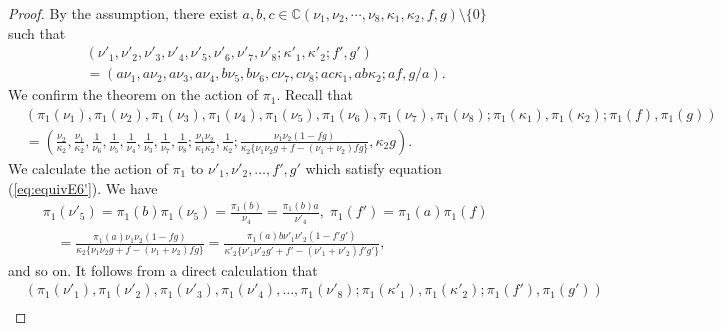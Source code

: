 \documentclass[12pt]{amsart}
\newcommand{\C}{\mathbb {C}}     %
\numberwithin{equation}{section}
\theoremstyle{definition}
\begin{document}
\begin{proof}
By the assumption, there exist $ a, b, c \in \C (\nu_1 , \nu_2 , \cdots ,\nu_8 ,\kappa_1 ,\kappa_2 , f ,g ) \setminus \{ 0 \} $ such that 
\begin{align}
&  (\nu '_1 , \nu '_2 , \nu '_3 , \nu '_4 ,\nu '_5 ,\nu '_6 , \nu '_7 ,\nu '_8 ; \kappa '_1 ,\kappa '_2 ; f' ,g' )  \label{eq:equivE6'} \\
& = (a \nu_1 , a \nu_2 , a \nu_3 , a \nu_4 ,b \nu_5 , b \nu_6 , c \nu_7 , c \nu_8 ; ac \kappa_1 , ab \kappa_2 ; af ,g/a). \nonumber
\end{align}
We confirm the theorem on the action of $\pi _1$.
Recall that
\begin{align}
& (\pi _1 ( \nu _1) , \pi _1 (\nu _2) , \pi _1 ( \nu _3) , \pi _1 ( \nu _4) , \pi _1 (\nu _5) , \pi _1 (\nu _6) , \pi _1 ( \nu _7) , \pi _1 (\nu _8) ;  \pi _1 (\kappa _1) , \pi _1 (\kappa _2) ;  \pi _1 (f ) , \pi _1 (g) ) \\
& = ( \frac{\nu  _2 }{\kappa _2}  , \frac{\nu  _1 }{\kappa _2}   , \frac{1}{ \nu _6} , \frac{1}{\nu  _5}  , \frac{1}{\nu  _4}  ,  \frac{1}{\nu  _3}  ,  \frac{1}{\nu _7} , \frac{1}{\nu _8} ; \frac{\nu _1 \nu _2 }{ \kappa_1\kappa _2}  , \frac{1}{ \kappa _2} ; \frac{\nu _1 \nu_2 ( 1- fg )}{ \kappa_2 \{ \nu _1 \nu_2 g + f- (\nu _1 + \nu _2 ) fg \} } , \kappa_2 g  ). \nonumber 
\end{align}
We calculate the action of $\pi _1$ to $\nu '_1 , \nu '_2 , \dots  , f' ,g' $ which satisfy equation (\ref{eq:equivE6'}).
We have
\begin{align}
&  \pi _1 ( \nu '_5 ) = \pi _1 ( b ) \pi _1 (\nu _5 )  =  \frac{\pi _1 ( b ) }{\nu _4} = \frac{\pi _1 ( b ) a }{ \nu '_4 } , \; \pi _1 ( f ') =  \pi _1 ( a ) \pi _1 (f )  \\
&  \quad = \frac{ \pi _1 ( a ) \nu _1 \nu_2 ( 1- fg )}{ \kappa_2 \{ \nu _1 \nu_2 g + f- (\nu _1 + \nu _2 ) fg \} }  = \frac{ \pi _1 ( a ) b \nu '_1 \nu '_2 ( 1- f'g' )}{ \kappa ' _2 \{ \nu '_1 \nu'_2 g' + f' - (\nu '_1 + \nu '_2 ) f' g' \} }  , \nonumber
\end{align}
and so on.
It follows from a direct calculation that
\begin{align}
& (\pi _1 ( \nu '_1) , \pi _1 (\nu '_2) , \pi _1 ( \nu '_3) , \pi _1 ( \nu '_4) , \dots , \pi _1 (\nu '_8) ; \pi _1 (\kappa '_1) , \pi _1 (\kappa '_2) ;  \pi _1 (f' ) , \pi _1 (g') ) \\

\end{align}
\end{proof}
\end{document}
